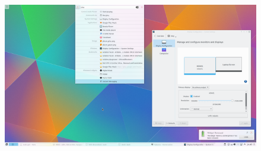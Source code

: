 \begin{frame}

\begin{figure}
 \includegraphics[height=0.7\textheight]{resources/640px-Kscreen-krunner.png}
 \end{figure}


\end{frame}


